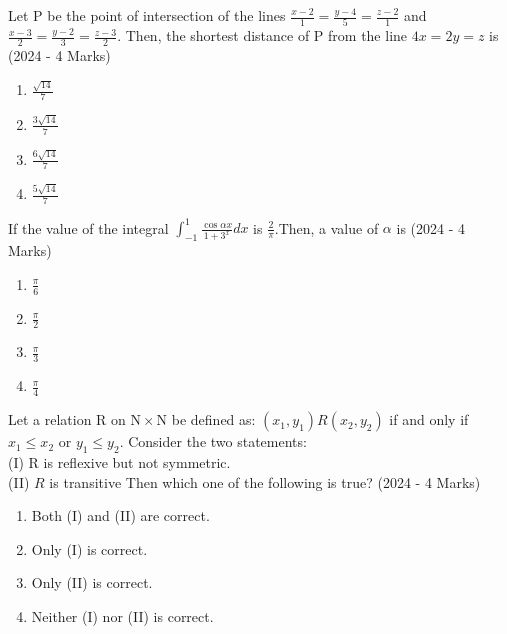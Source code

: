  	\item{
			
			Let P be the point of intersection of the lines $\frac{x-2}{1}=\frac{y-4}{5}=\frac{z-2}{1}$ and
			$\frac{x-3}{2}=\frac{y-2}{3}=\frac{z-3}{2}$. Then, the shortest distance of P from the line $4 x=2 y=z$ is\hfill
			{(2024 - 4 Marks)}
			
			\begin{multicols}{4}
				\begin{enumerate}
					\item $\frac{\sqrt{14}}{7}$
					\item $\frac{3 \sqrt{14}}{7}$
					\item $\frac{6 \sqrt{14}}{7}$
					\item $\frac{5 \sqrt{14}}{7}$
				\end{enumerate}
			\end{multicols}
			
		}
    \item{
          	
          	If the value of the integral $\int_{-1}^{1} \frac{\cos \alpha x}{1+3^{x}} d x$ is $\frac{2}{\pi}$.Then, a value of $\alpha$ is
             \text{ }
             \hfill
                {(2024 - 4 Marks)}
            \begin{multicols}{4}
                \begin{enumerate}
                	\item $\frac{\pi}{6}$
                	\item $\frac{\pi}{2}$
                	\item $\frac{\pi}{3}$
                	\item $\frac{\pi}{4}$
                \end{enumerate}
            \end{multicols}

        
        }
    \item{
	        
	       	Let a relation R on $\mathrm{N} \times \mathrm{N}$ be defined as:
	        $\left(x_{1}, y_{1}\right) R\left(x_{2}, y_{2}\right)$ if and only if $x_{1} \leq x_{2}$ or $y_{1} \leq y_{2}$.
	        Consider the two statements:\\
	        (I) R is reflexive but not symmetric.\\
	        (II) $R$ is transitive
	        Then which one of the following is true?
             \hfill
                {(2024 - 4 Marks)}
            \begin{multicols}{2}
                \begin{enumerate}
                	\item Both (I) and (II) are correct.
                	\item Only (I) is correct.
                	\item Only (II) is correct.
                	\item Neither (I) nor (II) is correct.
                \end{enumerate}
            \end{multicols}
        
        }
